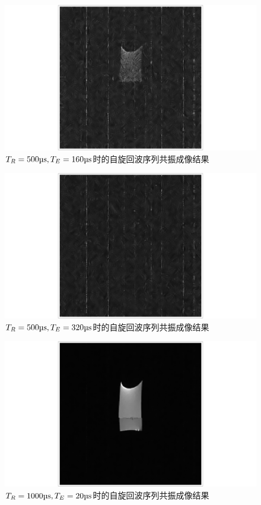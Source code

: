 \documentclass{thuemp}
\begin{document}
\begin{figure}[H]
    \centering
    \includegraphics[width=0.8\linewidth]{../Data/pre-experiment/MRI_result_TR_0500_TE160.png}
    \caption{$T_R = \text{\si{500 \micro\second}}, T_E = \text{\si{160 \micro\second}}$时的自旋回波序列共振成像结果}
    \label{fig:mri_0500_160}
\end{figure}

\begin{figure}[H]
    \centering
    \includegraphics[width=0.8\linewidth]{../Data/pre-experiment/MRI_result_TR_0500_TE320.png}
    \caption{$T_R = \text{\si{500 \micro\second}}, T_E = \text{\si{320 \micro\second}}$时的自旋回波序列共振成像结果}
    \label{fig:mri_0500_320}
\end{figure}

\begin{figure}[H]
    \centering
    \includegraphics[width=0.8\linewidth]{../Data/pre-experiment/MRI_result_TR_1000_TE_020.png}
    \caption{$T_R = \text{\si{1000 \micro\second}}, T_E = \text{\si{20 \micro\second}}$时的自旋回波序列共振成像结果}
    \label{fig:mri_1000_020}
\end{figure}
\end{document}
